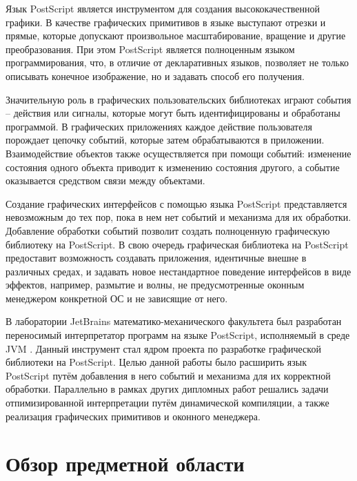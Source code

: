\documentclass[14pt]{matmex-diploma}
\begin{document}
Язык PostScript \cite{wiki:plrm} является инструментом для создания высококачественной графики. В качестве графических примитивов в языке выступают отрезки и прямые, которые допускают произвольное масштабирование, вращение и другие преобразования. При этом PostScript является полноценным языком программирования, что, в отличие от декларативных языков, позволяет не только описывать конечное изображение, но и задавать способ его получения.

Значительную роль в графических пользовательских библиотеках играют события --  действия или сигналы, которые могут быть идентифицированы и обработаны программой. В графических приложениях каждое действие пользователя порождает цепочку событий, которые затем обрабатываются в приложении. Взаимодействие объектов также осуществляется при помощи событий: изменение состояния одного объекта приводит к изменению состояния другого, а событие оказывается средством связи между объектами. 

Создание графических интерфейсов с помощью языка PostScript представляется невозможным до тех пор, пока в нем нет событий и механизма для их обработки. Добавление обработки событий позволит создать полноценную графическую библиотеку на PostScript. В свою очередь графическая библиотека на PostScript предоставит возможность создавать приложения, идентичные внешне в различных средах, и задавать новое нестандартное поведение интерфейсов в виде эффектов, например, размытие и волны, не предусмотренные оконным менеджером конкретной ОС и не зависящие от него.

В лаборатории JetBrains математико-механического факультета  был разработан переносимый интерпретатор программ на языке PostScript, исполняемый в среде JVM  \cite{wiki:makulov, wiki:pozdin, wiki:gudiev}. Данный инструмент стал ядром проекта по разработке графической библиотеки на  PostScript. Целью данной работы было расширить язык PostScript путём добавления в него событий и механизма для их корректной обработки. Параллельно в рамках других дипломных работ решались задачи отпимизированной интерпретации путём динамической компиляции, а также реализация графических примитивов и оконного менеджера.

 
\section{Обзор предметной области}
\end{document}
